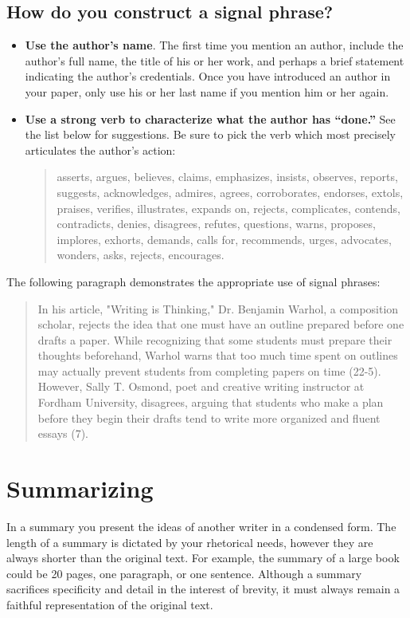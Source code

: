 \subsection{How do you construct a signal phrase?}
 
\begin{itemize}
\item \textbf{Use the author's name}. The first time you mention an author, include the 
author's full name, the title of his or her work, and perhaps a brief statement indicating the 
author's credentials. Once you have introduced an author in your paper, only use his or 
her last name if you mention him or her again.

\item \textbf{Use a strong verb to characterize what the author has “done.”} See the list 
below for suggestions. Be sure to pick the verb which most precisely articulates the 
author's action:

\begin{quote}
asserts, argues, believes, claims, emphasizes, insists, observes, reports, 
suggests, acknowledges, admires, agrees, corroborates, endorses, extols, praises, 
verifies, illustrates, expands on, rejects, complicates, contends, contradicts, denies, 
disagrees, refutes, questions, warns, proposes, implores, exhorts, demands, calls for, 
recommends, urges, advocates, wonders, asks, rejects, encourages.
\end{quote}

\end{itemize}
 
The following paragraph demonstrates the appropriate use of signal phrases:
 
 \begin{quote}
In his article, "Writing is Thinking," Dr. Benjamin Warhol, a composition scholar, rejects 
the idea that one must have an outline prepared before one drafts a paper. While 
recognizing that some students must prepare their thoughts beforehand, Warhol warns 
that too much time spent on outlines may actually prevent students from completing 
papers on time (22-5). However, Sally T. Osmond, poet and  creative writing instructor at 
Fordham University, disagrees, arguing that students who make a plan before they 
begin their drafts tend to write more organized and fluent essays (7). \end{quote}

\section{Summarizing}
In a summary you present the ideas of another writer in a condensed form. The length of a summary is dictated by your rhetorical needs, however they are always shorter than the original text. For example, the summary of a large book could be 20 pages, one paragraph, or one sentence. Although a summary sacrifices specificity and detail in the interest of brevity, it must always remain a faithful representation of the original text.


